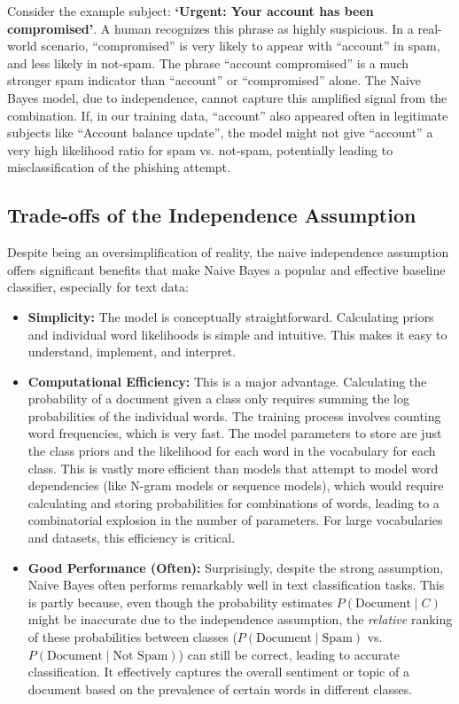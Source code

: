 \documentclass[12pt,letterpaper]{article}
\begin{document}
Consider the example subject: \textbf{`Urgent: Your account has been compromised'}. A human recognizes this phrase as highly suspicious. In a real-world scenario, ``compromised'' is very likely to appear with ``account'' in spam, and less likely in not-spam. The phrase ``account compromised'' is a much stronger spam indicator than ``account'' or ``compromised'' alone. The Naive Bayes model, due to independence, cannot capture this amplified signal from the combination. If, in our training data, ``account'' also appeared often in legitimate subjects like ``Account balance update'', the model might not give ``account'' a very high likelihood ratio for spam vs. not-spam, potentially leading to misclassification of the phishing attempt.

\subsection{Trade-offs of the Independence Assumption}

Despite being an oversimplification of reality, the naive independence assumption offers significant benefits that make Naive Bayes a popular and effective baseline classifier, especially for text data:

\begin{itemize}
    \item \textbf{Simplicity:} The model is conceptually straightforward. Calculating priors and individual word likelihoods is simple and intuitive. This makes it easy to understand, implement, and interpret.
    
    \item \textbf{Computational Efficiency:} This is a major advantage. Calculating the probability of a document given a class only requires summing the log probabilities of the individual words. The training process involves counting word frequencies, which is very fast. The model parameters to store are just the class priors and the likelihood for each word in the vocabulary for each class. This is vastly more efficient than models that attempt to model word dependencies (like N-gram models or sequence models), which would require calculating and storing probabilities for combinations of words, leading to a combinatorial explosion in the number of parameters. For large vocabularies and datasets, this efficiency is critical.
    
    \item \textbf{Good Performance (Often):} Surprisingly, despite the strong assumption, Naive Bayes often performs remarkably well in text classification tasks. This is partly because, even though the probability estimates $P(\text{Document} \mid C)$ might be inaccurate due to the independence assumption, the \textit{relative} ranking of these probabilities between classes ($P(\text{Document} \mid \text{Spam})$ vs. $P(\text{Document} \mid \text{Not Spam})$) can still be correct, leading to accurate classification. It effectively captures the overall sentiment or topic of a document based on the prevalence of certain words in different classes.
\end{itemize}
\end{document}
